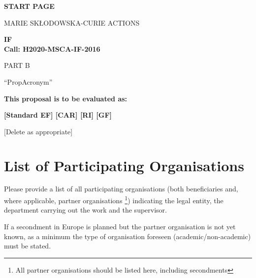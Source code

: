 
\phantom{a}
\vspace{15mm}
\begin{center}


        \Large{
      
     
        \textbf{START PAGE}
  
          \vspace{15mm}
          MARIE SK\L{}ODOWSKA-CURIE ACTIONS\\
          \vspace{1cm}
          
          \textbf{\acf{IF}}\\
          \textbf{Call: H2020-MSCA-IF-2016}
          \vspace{2cm}                   

          PART B
          \vspace{2.5cm}

          ``{\sc \ac{PropAcronym}\xspace}''
          \vspace{2cm}

          \textbf{This proposal is to be evaluated as:}
          \vspace{.5cm}

          \textbf{[Standard EF] [CAR] [RI] [GF]}\\
        }
        \large{[Delete as appropriate]}

  \end{center}
\vspace{1cm}

\newpage
\setcounter{tocdepth}{1}
\tableofcontents


\newpage
{}
\section*{List of Participating Organisations}
\label{sec:participants}

Please provide a list of all participating organisations (both beneficiaries and, where applicable, partner organisations%
\footnote{All partner organisations should be listed here, including secondments}) 
indicating the legal entity, the department carrying out the work and the supervisor.

\medskip\noindent
If a secondment in Europe is planned but the partner organisation is not yet known, as a minimum the type of organisation foreseen (academic/non-academic) must be stated.


